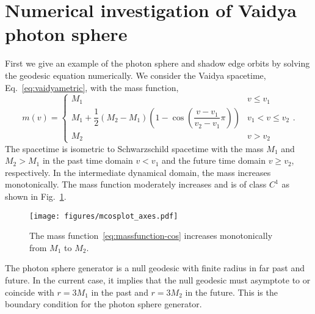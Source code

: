 \documentclass[prd,showpacs,preprintnumbers,groupedaddress,superscriptaddress,nofootinbib,11pt]{revtex4-1} %
\theoremstyle{newplain}
\begin{document}
\afterpage{\clearpage}
\newpage

\section{Numerical investigation of Vaidya photon sphere}
\label{sec:case1}
First we give an example of the photon sphere and shadow edge orbits by solving the geodesic equation numerically.
We consider the Vaidya spacetime, Eq.~\eqref{eq:vaidyametric}, with the mass function,
\begin{equation}
\label{eq:massfunction-cos}
m(v)=\left\{
\begin{array}{cc}
M_1 & v\le v_1\\
M_1+\dfrac{1}{2}(M_2-M_1)\left(1-\cos\left(\dfrac{v-v_1}{v_2-v_1}\pi\right)\right) & v_1<v\le v_2\\
M_2 & v>v_2
\end{array}
\right. .
\end{equation}
The spacetime is isometric to Schwarzschild spacetime with the mass $M_1$ and $M_2>M_1$ in the past time domain $v<v_1$ and the future time domain $v\ge v_2$, respectively.
In the intermediate dynamical domain, the mass increases monotonically.
The mass function moderately increases and is of class $C^1$ as shown in Fig.~\ref{fig:mass-cos}.

\begin{figure}[h]%
\texttt{[image: figures/mcosplot\_axes.pdf]}
\caption{\label{fig:mass-cos} 
The mass function~\eqref{eq:massfunction-cos} increases monotonically from $M_1$ to $M_2$.
}
\end{figure}

The photon sphere generator is a null geodesic with finite radius in far past and future.
In the current case, it implies that the null geodesic must asymptote to or coincide with $r=3M_1$ in the past and $r=3M_2$ in the future.
This is the boundary condition for the photon sphere generator.
\end{document}
